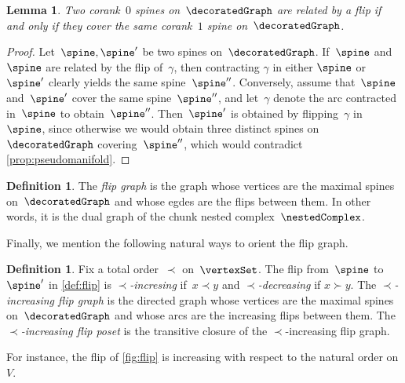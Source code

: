 \documentclass{amsart}
\newtheorem{lemma}[theorem]{Lemma}
\theoremstyle{definition}
\newtheorem{definition}[theorem]{Definition}
\newcommand{\darkblue}{\color{darkblue}} %
\newcommand{\defn}[1]{\textsl{\darkblue #1}} %
\begin{document}
\begin{lemma}
  Two corank~$0$ spines on~$\decoratedGraph$ are related by a flip if and only if they cover the same corank~$1$ spine on~$\decoratedGraph$.
\end{lemma}

\begin{proof}
  Let~$\spine,\spine'$ be two spines on~$\decoratedGraph$.
  If~$\spine$ and~$\spine$ are related by the flip of~$\gamma$, then contracting $\gamma$ in either $\spine$ or $\spine'$ clearly yields the same spine~$\spine''$.
  Conversely, assume that~$\spine$ and~$\spine'$ cover the same spine~$\spine''$, and let~$\gamma$ denote the arc contracted in~$\spine$ to obtain~$\spine''$.
  Then~$\spine'$ is obtained by flipping~$\gamma$ in~$\spine$, since otherwise we would obtain three distinct spines on~$\decoratedGraph$ covering~$\spine''$, which would contradict \cref{prop:pseudomanifold}.
\end{proof}

\begin{definition}
  \label{def:flipGraph}
  The \defn{flip graph} is the graph whose vertices are the maximal spines on~$\decoratedGraph$ and whose egdes are the flips between them.
  In other words, it is the dual graph of the chunk nested complex~$\nestedComplex$.
\end{definition}

Finally, we mention the following natural ways to orient the flip graph.

\begin{definition}
  \label{def:increasingFlip}
  Fix a total order~$\prec$ on~$\vertexSet$.
  The flip from~$\spine$ to~$\spine'$ in \cref{def:flip} is \defn{$\prec$-incresing} if~$x \prec y$ and \defn{$\prec$-decreasing} if $x \succ y$.
  The \defn{$\prec$-increasing flip graph} is the directed graph whose vertices are the maximal spines on~$\decoratedGraph$ and whose arcs are the increasing flips between them.
  The \defn{$\prec$-increasing flip poset} is the transitive closure of the $\prec$-increasing flip graph.
\end{definition}

For instance, the flip of \cref{fig:flip} is increasing with respect to the natural order on $V$.
\end{document}

